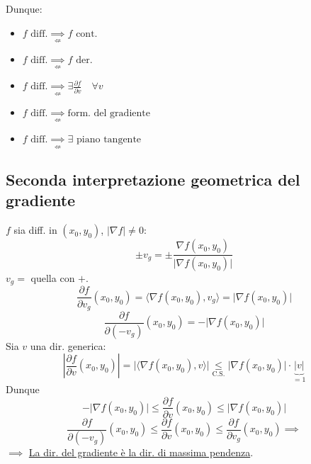 \begin{oss}
Dunque:
\begin{itemize}
    \item $f \text{ diff.} \underset{\not\Longleftarrow}{\implies} f \text{ cont.}$
    \item $f \text{ diff.} \underset{\not\Longleftarrow}{\implies} f \text{ der.}$
    \item $f \text{ diff.} \underset{\not\Longleftarrow}{\implies} \exists \frac{\partial f}{\partial v} \quad \forall v$
    \item $f \text{ diff.} \underset{\not\Longleftarrow}{\implies} \text{form. del gradiente}$
    \item $f \text{ diff.} \underset{\not\Longleftarrow}{\implies} \exists \text{ piano tangente}$
\end{itemize}
\end{oss}

\begin{example*}
\end{example*}

\subsection{Seconda interpretazione geometrica del gradiente}

$f$ sia diff. in $(x_0, y_0)$, $\vert \nabla f \vert \neq 0$:
\[
\pm v_g = \pm \frac{\nabla f(x_0, y_0)}{\vert \nabla f(x_0, y_0) \vert}
\]
$v_g =$ quella con $+$.
\[
\frac{\partial f}{\partial v_g}(x_0, y_0) = \langle \nabla f(x_0, y_0), v_g \rangle = \vert \nabla f(x_0, y_0) \vert
\]
\[
\frac{\partial f}{\partial (-v_g)}(x_0, y_0) = -\vert \nabla f(x_0, y_0) \vert
\]
Sia $v$ una dir. generica:
\[
\left\vert \frac{\partial f}{\partial v}(x_0, y_0) \right\vert = \vert \langle \nabla f(x_0, y_0), v \rangle \vert \underset{\text{C.S.}}{\le} \vert \nabla f(x_0, y_0) \vert \cdot \underbrace{\vert v \vert}_{= 1}
\]
Dunque
\[
-\vert \nabla f(x_0, y_0) \vert \le \frac{\partial f}{\partial v}(x_0, y_0) \le \vert \nabla f(x_0, y_0) \vert
\]
\[
\frac{\partial f}{\partial (-v_g)}(x_0, y_0) \le \frac{\partial f}{\partial v}(x_0, y_0) \le \frac{\partial f}{\partial v_g}(x_0, y_0) \implies
\]
$\implies$ \underline{La dir. del gradiente è la dir. di massima pendenza}.

